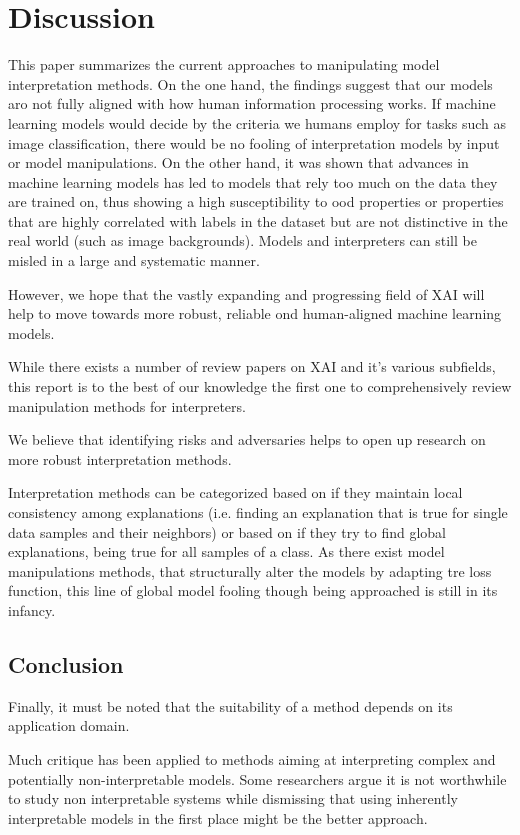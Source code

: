 \section{Discussion}

This paper summarizes the current approaches to manipulating model interpretation methods. 
On the one hand, the findings suggest that our models aro not fully aligned with how human information processing works. If machine learning models would decide by the criteria we humans employ for tasks such as image classification, there would be no fooling of interpretation models by input or model manipulations. 
On the other hand, it was shown that advances in machine learning models has led to models that rely too much on the data they are trained on, thus showing a high susceptibility to ood properties or properties that are highly correlated with labels in the dataset but are not distinctive in the real world (such as image backgrounds). Models and interpreters can still be misled in a large and systematic manner. 

However, we hope that the vastly expanding and progressing field of XAI will help to move towards more robust, reliable ond human-aligned machine learning models. 

While there exists a number of review papers on XAI and it's various subfields, this report is to the best of our knowledge the first one to comprehensively review manipulation methods for interpreters. 

We believe that identifying risks and adversaries helps to open up research on more robust interpretation methods. 

Interpretation methods can be categorized based on if they maintain local consistency among explanations (i.e. finding an explanation that is true for single data samples and their neighbors) or based on if they try to find global explanations, being true for all samples of a class. 
As there exist model manipulations methods, that structurally alter the models by adapting tre loss function, this line of global model fooling though being approached is still in its infancy. 


\subsection{Conclusion}
Finally, it must be noted that the suitability of a method depends on its application domain. 


Much critique has been applied to methods aiming at interpreting complex and potentially non-interpretable models. 
Some researchers argue it is not worthwhile to study non interpretable systems while dismissing that using inherently interpretable models in the first place might be the better approach. 

